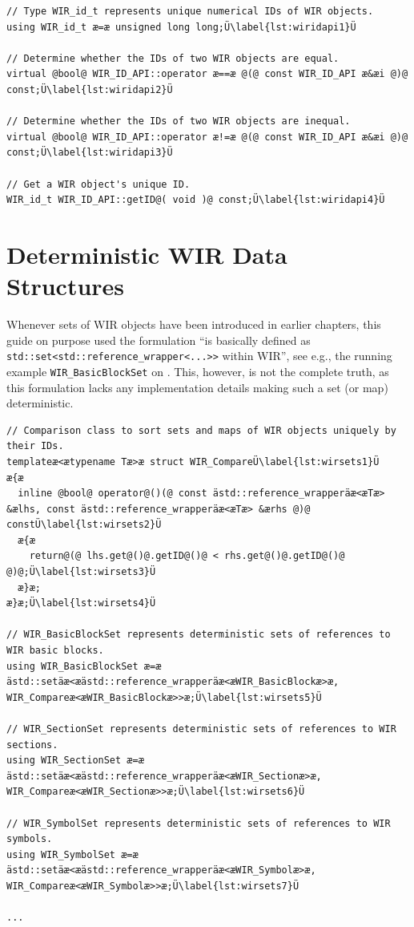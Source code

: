 \begin{lstlisting}[style=code,float=t,caption={Handling of Unique Object Identifiers by Class \texttt{WIR\_ID\_API}},label=lst:wiridapi]
// Type WIR_id_t represents unique numerical IDs of WIR objects.
using WIR_id_t æ=æ unsigned long long;Ü\label{lst:wiridapi1}Ü

// Determine whether the IDs of two WIR objects are equal.
virtual @bool@ WIR_ID_API::operator æ==æ @(@ const WIR_ID_API æ&æi @)@ const;Ü\label{lst:wiridapi2}Ü

// Determine whether the IDs of two WIR objects are inequal.
virtual @bool@ WIR_ID_API::operator æ!=æ @(@ const WIR_ID_API æ&æi @)@ const;Ü\label{lst:wiridapi3}Ü

// Get a WIR object's unique ID.
WIR_id_t WIR_ID_API::getID@( void )@ const;Ü\label{lst:wiridapi4}Ü
\end{lstlisting}


\section{Deterministic WIR Data Structures}
\label{sec:determinism}

Whenever sets of \gls{WIR} objects have been introduced in earlier chapters, this guide on purpose used the formulation ``is basically defined as \texttt{std::set<std::reference\_wrapper<...>{}>} within \gls{WIR}'', see e.g., the running example \texttt{WIR\_BasicBlockSet} on .
This, however, is not the complete truth, as this formulation lacks any implementation details making such a set (or map) deterministic.

\begin{lstlisting}[style=code,float=!b,caption={Declaration of Deterministic Data Structures in file \texttt{wirtypes.h}},label=lst:wirsets]
// Comparison class to sort sets and maps of WIR objects uniquely by their IDs.
templateæ<ætypename Tæ>æ struct WIR_CompareÜ\label{lst:wirsets1}Ü
æ{æ
  inline @bool@ operator@()(@ const ästd::reference_wrapperäæ<æTæ> &ælhs, const ästd::reference_wrapperäæ<æTæ> &ærhs @)@ constÜ\label{lst:wirsets2}Ü
  æ{æ
    return@(@ lhs.get@()@.getID@()@ < rhs.get@()@.getID@()@ @)@;Ü\label{lst:wirsets3}Ü
  æ}æ;
æ}æ;Ü\label{lst:wirsets4}Ü

// WIR_BasicBlockSet represents deterministic sets of references to WIR basic blocks.
using WIR_BasicBlockSet æ=æ ästd::setäæ<æästd::reference_wrapperäæ<æWIR_BasicBlockæ>æ, WIR_Compareæ<æWIR_BasicBlockæ>>æ;Ü\label{lst:wirsets5}Ü

// WIR_SectionSet represents deterministic sets of references to WIR sections.
using WIR_SectionSet æ=æ ästd::setäæ<æästd::reference_wrapperäæ<æWIR_Sectionæ>æ, WIR_Compareæ<æWIR_Sectionæ>>æ;Ü\label{lst:wirsets6}Ü

// WIR_SymbolSet represents deterministic sets of references to WIR symbols.
using WIR_SymbolSet æ=æ ästd::setäæ<æästd::reference_wrapperäæ<æWIR_Symbolæ>æ, WIR_Compareæ<æWIR_Symbolæ>>æ;Ü\label{lst:wirsets7}Ü

...
\end{lstlisting}

